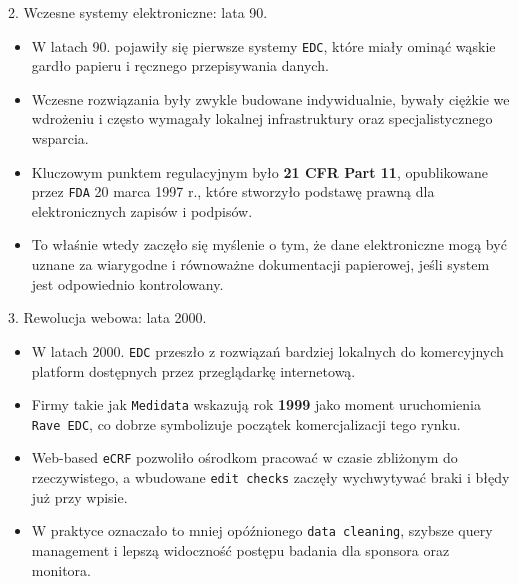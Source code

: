 \begin{frame}{2. Wczesne systemy elektroniczne: lata 90.}
  \begin{itemize}
    \item W latach 90. pojawiły się pierwsze systemy \texttt{EDC}, które miały ominąć wąskie gardło papieru i ręcznego przepisywania danych.
    \item Wczesne rozwiązania były zwykle budowane indywidualnie, bywały ciężkie we wdrożeniu i często wymagały lokalnej infrastruktury oraz specjalistycznego wsparcia.
    \item Kluczowym punktem regulacyjnym było \textbf{21 CFR Part 11}, opublikowane przez \texttt{FDA} 20 marca 1997 r., które stworzyło podstawę prawną dla elektronicznych zapisów i podpisów.
    \item To właśnie wtedy zaczęło się myślenie o tym, że dane elektroniczne mogą być uznane za wiarygodne i równoważne dokumentacji papierowej, jeśli system jest odpowiednio kontrolowany.
  \end{itemize}
\end{frame}

\begin{frame}{3. Rewolucja webowa: lata 2000.}
  \begin{itemize}
    \item W latach 2000. \texttt{EDC} przeszło z rozwiązań bardziej lokalnych do komercyjnych platform dostępnych przez przeglądarkę internetową.
    \item Firmy takie jak \texttt{Medidata} wskazują rok \textbf{1999} jako moment uruchomienia \texttt{Rave EDC}, co dobrze symbolizuje początek komercjalizacji tego rynku.
    \item Web-based \texttt{eCRF} pozwoliło ośrodkom pracować w czasie zbliżonym do rzeczywistego, a wbudowane \texttt{edit checks} zaczęły wychwytywać braki i błędy już przy wpisie.
    \item W praktyce oznaczało to mniej opóźnionego \texttt{data cleaning}, szybsze query management i lepszą widoczność postępu badania dla sponsora oraz monitora.
  \end{itemize}
\end{frame}

